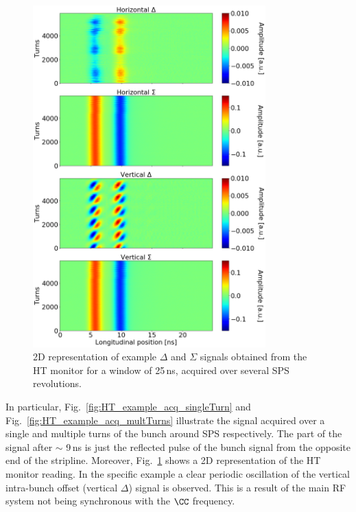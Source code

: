 \begin{figure}[!h]
   \centering         
   \includegraphics[width=0.8\textwidth]{images/Ch4/HT_2D__20180530_114730_colorbar.png}
       \caption{2D representation of example $\Delta$ and $\Sigma$ signals obtained from the HT monitor for a window of 25\,ns, acquired over several SPS revolutions.}
       \label{fig:HT_example_acq_multTurns_2D}
\end{figure}

In particular, Fig.~\ref{fig:HT_example_acq_singleTurn} and Fig.~\ref{fig:HT_example_acq_multTurns} illustrate the signal acquired over a single and multiple turns of the bunch around SPS respectively. The part of the signal after $\sim$ 9\,ns is just the reflected pulse of the bunch signal from the opposite end of the stripline. Moreover, Fig.~\ref{fig:HT_example_acq_multTurns_2D} shows a 2D representation of the HT monitor reading. In the specific example a clear periodic oscillation of the vertical intra-bunch offset (vertical $\Delta$) signal is observed. This is a result of the main RF system not being synchronous with the  $\CC$  frequency. 


